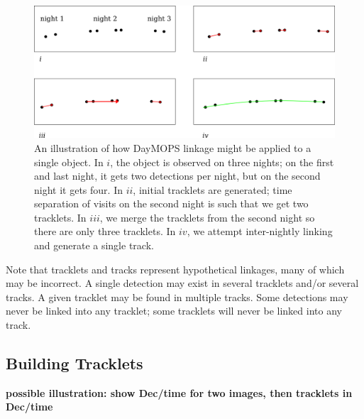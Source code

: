 \begin{figure}[ht]
  \centering
    \includegraphics[width=16cm]{illustrations/oneObjectMops.png}
    \caption{ An illustration of how DayMOPS linkage might be applied
      to a single object.  In $i$, the object is observed on three
      nights; on the first and last night, it gets two detections per
      night, but on the second night it gets four.  In $ii$, initial
      tracklets are generated; time separation of visits on the second
      night is such that we get two tracklets.  In $iii$, we merge the
      tracklets from the second night so there are only three
      tracklets.  In $iv$, we attempt inter-nightly linking and
      generate a single track.}
\label{objectPlotted}
\end{figure}


Note that tracklets and tracks represent hypothetical linkages, many
of which may be incorrect.  A single detection may exist in several
tracklets and/or several tracks.  A given tracklet may be found in
multiple tracks.  Some detections may never be linked into any
tracklet; some tracklets will never be linked into any track.  





\subsection{Building Tracklets}

\textbf{ possible illustration: show Dec/time for two images, then tracklets in Dec/time}

